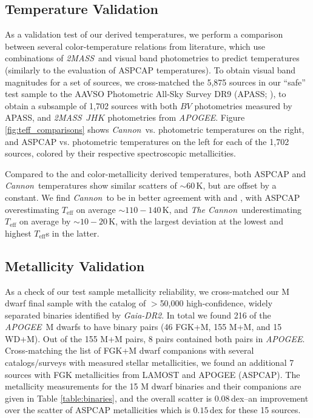 \documentclass[twocolumn]{aastex62}
\newcommand{\apogee}{\textsl{APOGEE}}
\newcommand{\thecannon}{\textsl{The Cannon}}
\newcommand{\cannon}{\textsl{Cannon}}
\newcommand{\drtwo}{\textsl{Gaia-DR2}}
\newcommand{\zmass}{\textsl{2MASS}}
\newcommand{\teff}{T_{\mathrm{eff}}}
\begin{document}
\subsection{Temperature Validation}

As a validation test of our derived temperatures, we perform a comparison between several color-temperature relations from literature, which use combinations of \zmass\ and visual band photometries to predict temperatures (similarly to the \citealt{Schmidt:2016} evaluation of ASPCAP temperatures). To obtain visual band magnitudes for a set of sources, we cross-matched the 5,875 sources in our ``safe'' test sample to the AAVSO Photometric All-Sky Survey DR9 (APASS; \citealt{Henden:2016}), to obtain a subsample of 1,702 sources with both $BV$ photometries measured by APASS, and \zmass\ $JHK$ photometries from \apogee. Figure \ref{fig:teff_comparisons} shows \cannon\ vs. photometric temperatures on the right, and ASPCAP vs. photometric temperatures on the left for each of the 1,702 sources, colored by their respective spectroscopic metallicities.

Compared to the \citealt{Mann:2015} and \citealt{Boyajian:2012} color-metallicity derived temperatures, both ASPCAP and \cannon\ temperatures show similar scatters of $\sim60\,$K, but are offset by a constant.
We find \cannon\ to be in better agreement with \citealt{Mann:2015} and \citealt{Boyajian:2012}, with ASPCAP overestimating $\teff$ on average $\sim110-140\,$K, and \thecannon\ underestimating $\teff$ on average by $\sim10-20\,$K, with the largest deviation at the lowest and highest $\teff$s in the latter.

\subsection{Metallicity Validation}

As a check of our test sample metallicity reliability, we cross-matched our M dwarf final sample with the \citealt{Elbadry:2018b} catalog of $>$50,000 high-confidence, widely separated binaries identified by \drtwo. 
In total we found 216 of the \apogee\ M dwarfs to have binary pairs (46 FGK+M, 155 M+M, and 15 WD+M). Out of the 155 M+M pairs, 8 pairs contained both pairs in \apogee. Cross-matching the list of FGK+M dwarf companions with several catalogs/surveys with measured stellar metallicities, we found an additional 7 sources with FGK metallicities from LAMOST \citep{Zhao:2012} and APOGEE (ASPCAP). The metallicity measurements for the 15 M dwarf binaries and their companions are given in Table \ref{table:binaries}, and the overall scatter is $0.08\,$dex--an improvement over the scatter of ASPCAP metallicities which is $0.15\,$dex for these 15 sources.
\end{document}
